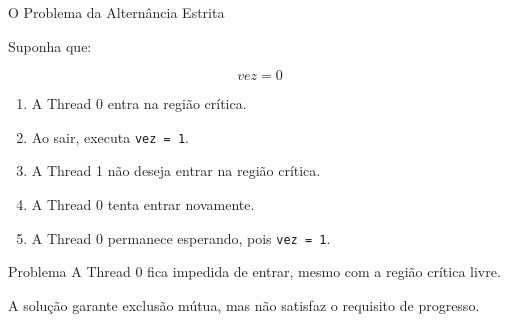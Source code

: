 \documentclass[aspectratio=169,11pt]{beamer}
\begin{document}
\begin{frame}{O Problema da Alternância Estrita}

Suponha que:

\[
vez = 0
\]

\begin{enumerate}
    \setlength{\itemsep}{0.3cm}

    \item A Thread 0 entra na região crítica.

    \item Ao sair, executa \texttt{vez = 1}.

    \item A Thread 1 não deseja entrar
          na região crítica.

    \item A Thread 0 tenta entrar novamente.

    \item A Thread 0 permanece esperando,
          pois \texttt{vez = 1}.
\end{enumerate}

\vspace{0.3cm}

\begin{alertblock}{Problema}
A Thread 0 fica impedida de entrar,
mesmo com a região crítica livre.
\end{alertblock}

\vspace{0.2cm}

A solução garante exclusão mútua,
mas não satisfaz o requisito de progresso.

\end{frame}


\end{document}
